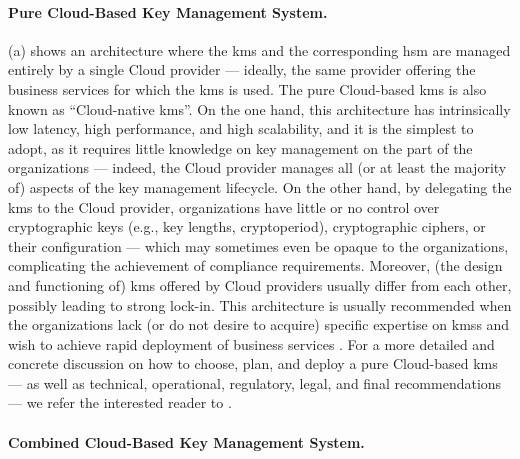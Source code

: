 \paragraph*{Pure Cloud-Based Key Management System.}

(a) shows an architecture where the \gls{kms} and the corresponding \gls{hsm} are managed entirely by a single Cloud provider --- ideally, the same provider offering the business services for which the \gls{kms} is used. The pure Cloud-based \gls{kms} is also known as ``Cloud-native \gls{kms}''. On the one hand, this architecture has intrinsically low latency, high performance, and high scalability, and it is the simplest to adopt, as it requires little knowledge on key management on the part of the organizations --- indeed, the Cloud provider manages all (or at least the majority of) aspects of the key management lifecycle. On the other hand, by delegating the \gls{kms} to the Cloud provider, organizations have little or no control over cryptographic keys (e.g., key lengths, cryptoperiod), cryptographic ciphers, or their configuration --- which may sometimes even be opaque to the organizations, complicating the achievement of compliance requirements. Moreover, (the design and functioning of) \gls{kms} offered by Cloud providers usually differ from each other, possibly leading to strong lock-in. This architecture is usually recommended when the organizations lack (or do not desire to acquire) specific expertise on \glspl{kms} and wish to achieve rapid deployment of business services \cite{csa_key_2020}. For a more detailed and concrete discussion on how to choose, plan, and deploy a pure Cloud-based \gls{kms} --- as well as technical, operational, regulatory, legal, and final recommendations --- we refer the interested reader to \cite{csa_recommendations_2021}.


\paragraph*{Combined Cloud-Based Key Management System.}

